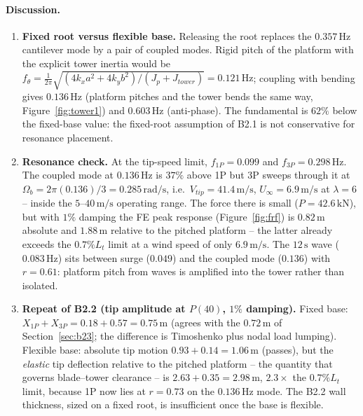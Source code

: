 \documentclass[11pt,a4paper]{article}
\begin{document}
\paragraph{Discussion.}
\begin{enumerate}
\item \textbf{Fixed root versus flexible base.} Releasing the root replaces the $0.357\,\mathrm{Hz}$ cantilever mode by a pair of coupled modes. Rigid pitch of the platform with the explicit tower inertia would be $f_\theta=\frac1{2\pi}\sqrt{(4k_xa^2+4k_yb^2)/(J_p+J_{tower})}=0.121\,\mathrm{Hz}$; coupling with bending gives $0.136\,\mathrm{Hz}$ (platform pitches and the tower bends the same way, Figure~\ref{fig:tower1}) and $0.603\,\mathrm{Hz}$ (anti-phase). The fundamental is $62\%$ below the fixed-base value: the fixed-root assumption of B2.1 is not conservative for resonance placement.
\item \textbf{Resonance check.} At the tip-speed limit, $f_{1P}=0.099$ and $f_{3P}=0.298\,\mathrm{Hz}$. The coupled mode at $0.136\,\mathrm{Hz}$ is $37\%$ above 1P but 3P sweeps through it at $\Omega_b=2\pi(0.136)/3=0.285\,\mathrm{rad/s}$, i.e.\ $V_{tip}=41.4\,\mathrm{m/s}$, $U_\infty=6.9\,\mathrm{m/s}$ at $\lambda=6$ -- inside the $5$--$40\,\mathrm{m/s}$ operating range. The force there is small ($P=42.6\,\mathrm{kN}$), but with $1\%$ damping the FE peak response (Figure~\ref{fig:frf}) is $0.82\,\mathrm{m}$ absolute and $1.88\,\mathrm{m}$ relative to the pitched platform -- the latter already exceeds the $0.7\%L_t$ limit at a wind speed of only $6.9\,\mathrm{m/s}$. The $12\,\mathrm{s}$ wave ($0.083\,\mathrm{Hz}$) sits between surge ($0.049$) and the coupled mode ($0.136$) with $r=0.61$: platform pitch from waves is amplified into the tower rather than isolated.
\item \textbf{Repeat of B2.2 (tip amplitude at $P(40)$, $1\%$ damping).} Fixed base: $X_{1P}+X_{3P}=0.18+0.57=0.75\,\mathrm{m}$ (agrees with the $0.72\,\mathrm{m}$ of Section~\ref{sec:b23}; the difference is Timoshenko plus nodal load lumping). Flexible base: absolute tip motion $0.93+0.14=1.06\,\mathrm{m}$ (passes), but the \emph{elastic} tip deflection relative to the pitched platform -- the quantity that governs blade--tower clearance -- is $2.63+0.35=2.98\,\mathrm{m}$, $2.3\times$ the $0.7\%L_t$ limit, because 1P now lies at $r=0.73$ on the $0.136\,\mathrm{Hz}$ mode. The B2.2 wall thickness, sized on a fixed root, is insufficient once the base is flexible.

\end{enumerate}
\end{document}

